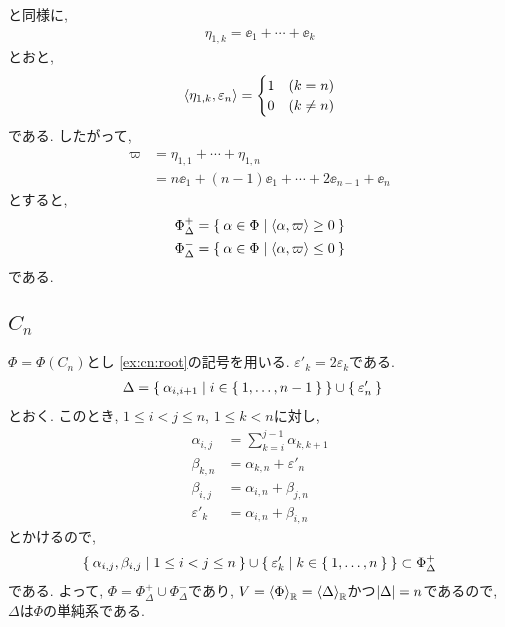 と同様に,
\begin{align*}
  \eta_{1,k}=\ee_1+\cdots+\ee_k
\end{align*}
とおと,
\begin{align*}
  \Braket{\eta_{1,k},\varepsilon_{n}}=
  \begin{cases}
    1 &(k=n)\\
    0 &(k\neq n)
  \end{cases}
\end{align*}
である.
したがって,
\begin{align*}
  \varpi&=\eta_{1,1}+\cdots+\eta_{1,n}\\
  &=n\ee_1+(n-1)\ee_1+\cdots+2\ee_{n-1}+\ee_{n}
\end{align*}
  とすると,
\begin{align*}
\Phi_\Delta^+&=\Set{\alpha\in\Phi|\Braket{\alpha,\varpi}\geq 0}\\
\Phi_\Delta^-&=\Set{\alpha\in\Phi|\Braket{\alpha,\varpi}\leq 0}
\end{align*}
である.


\subsection{$C_{n}$}
\label{ex:cn:simple}
$\Phi=\Phi(C_n)$とし
\cref{ex:cn:root}の記号を用いる.
$\varepsilon'_k=2\varepsilon_k$である.
\begin{align*}
  \Delta&=\Set{\alpha_{i,i+1}|i\in\Set{1,\ldots,n-1}}\cup \Set{\varepsilon'_n}
\end{align*}
とおく.
このとき, $1\leq i<j\leq n$, $1\leq k <n$に対し,
\begin{align*}
\alpha_{i,j}&=\sum_{k=i}^{j-1}\alpha_{k,k+1}\\
\beta_{k,n}&=\alpha_{k,n}+\varepsilon'_{n}\\
\beta_{i,j}&=\alpha_{i,n}+\beta_{j,n}\\
\varepsilon'_{k}&=\alpha_{i,n}+\beta_{i,n}
\end{align*}
とかけるので,
\begin{align*}
  \Set{\alpha_{i,j},\beta_{i,j}|1\leq i<j\leq n}\cup \Set{\varepsilon'_k | k\in\Set{1,\ldots,n}}\subset\Phi_\Delta^+
\end{align*}
である. よって, $\Phi=\Phi_\Delta^+\cup \Phi_\Delta^-$であり, $V=\Braket{\Phi}_{\mathbb{R}}=\Braket{\Delta}_{\mathbb{R}}$かつ$\left|\Delta\right|=n$であるので,
$\Delta$は$\Phi$の単純系である.


